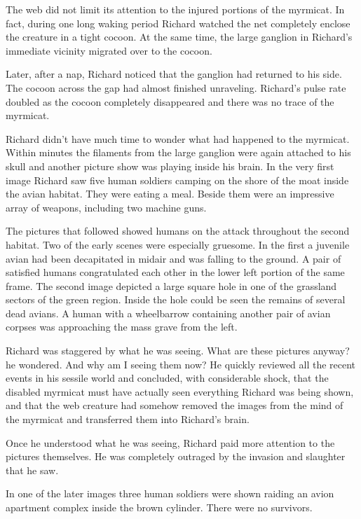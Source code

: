 \documentclass[]{article}
\begin{document}
{{The web did not limit its attention to the injured portions of the myrmicat. In fact, during one long waking period Richard watched the net completely enclose the creature in a tight cocoon. At the same time, the large ganglion in Richard’s immediate vicinity migrated over to the cocoon.

Later, after a nap, Richard noticed that the ganglion had returned to his side. The cocoon across the gap had almost finished unraveling. Richard’s pulse rate doubled as the cocoon completely disappeared and there was no trace of the myrmicat.

Richard didn’t have much time to wonder what had happened to the myrmicat. Within minutes the filaments from the large ganglion were again attached to his skull and another picture show was playing inside his brain. In the very first image Richard saw five human soldiers camping on the shore of the moat inside the avian habitat. They were eating a meal. Beside them were an impressive array of weapons, including two machine guns.

The pictures that followed showed humans on the attack throughout the second habitat. Two of the early scenes were especially gruesome. In the first a juvenile avian had been decapitated in midair and was falling to the ground. A pair of satisfied humans congratulated each other in the lower left portion of the same frame. The second image depicted a large square hole in one of the grassland sectors of the green region. Inside the hole could be seen the remains of several dead avians. A human with a wheelbarrow containing another pair of avian corpses was approaching the mass grave from the left.

Richard was staggered by what he was seeing. What are these pictures anyway? he wondered. And why am I seeing them now? He quickly reviewed all the recent events in his sessile world and concluded, with considerable shock, that the disabled myrmicat must have actually seen everything Richard was being shown, and that the web creature had somehow removed the images from the mind of the myrmicat and transferred them into Richard’s brain.

Once he understood what he was seeing, Richard paid more attention to the pictures themselves. He was completely outraged by the invasion and slaughter that he saw.

In one of the later images three human soldiers were shown raiding an avion apartment complex inside the brown cylinder. There were no survivors.

}}
\end{document}
